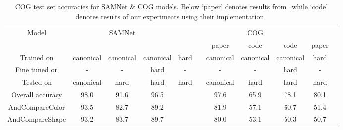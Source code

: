 \begin{table}[t]
\caption{COG test set accuracies for SAMNet \& COG models. Below `paper' denotes results from~\cite{yang2018dataset} 
	while `code' denotes results of our experiments using their implementation~\cite{yang2018implement}}

\centering
\begin{adjustbox}{width=\textwidth}
\begin{tabular}{ccccccccccc}
	\toprule
	Model & & SAMNet & && && COG&& \\
	\cmidrule{2-5} \cmidrule{7-11} 
	&&&&& & paper & code & code & paper&\\
	\cmidrule{7-9} \cmidrule{10-11}
	Trained on       & canonical & canonical & canonical & hard &           &  canonical  & canonical  & canonical & hard \\ 
	Fine tuned on  & - & - & hard  & - &           & -   & - & hard & - \\ 
	Tested on        & canonical & hard & hard & hard &            &canonical  & hard & hard & hard  \\ 
	\midrule	
	Overall accuracy & 98.0 & 91.6 & 96.5  &  &           & 97.6  & 65.9 & 78.1& 80.1 \\ 	
	\midrule 	
	AndCompareColor	&	93.5		&	82.7	&	89.2	& &		&81.9	&57.1&60.7  &	51.4 \\ 
	AndCompareShape	&	93.2 		&	83.7	&	89.7	&&	&	80.0	&53.1	&50.3 &50.7 \\ 
	\bottomrule
\end{tabular}
\end{adjustbox}
\label{tab:results}
\end{table}


%		
%		
%		
%		
%		



